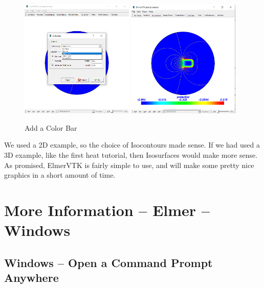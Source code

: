 \begin{figure}[H]
\begin{center}
\includegraphics[width=0.48\textwidth]{vtk-6}
\includegraphics[width=0.48\textwidth]{vtk-7}
\caption{Add a Color Bar}\label{fg:vtk-6}
\end{center}
\end{figure}

We used a 2D example, so the choice of Isocontours made sense.  If we had used a 3D example, like the first heat tutorial, then Isosurfaces would make more sense.\\

As promised, ElmerVTK is fairly simple to use, and will make some pretty nice graphics in a short amount of time.


\chapter{More Information -- Elmer -- Windows}

\section{Windows -- Open a Command Prompt Anywhere}

